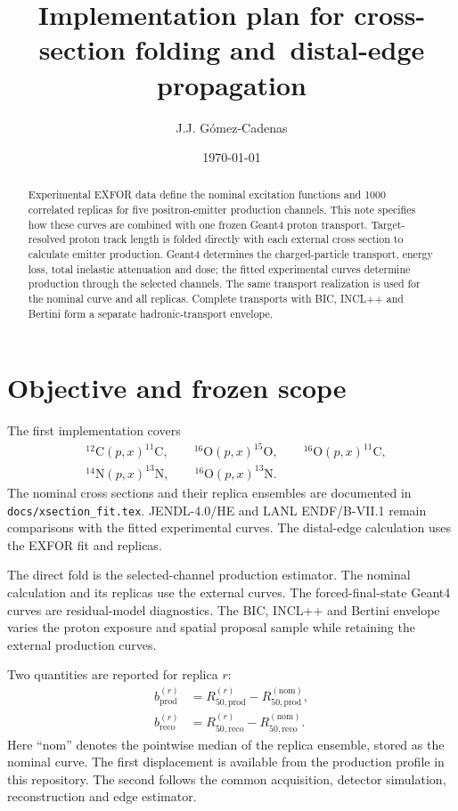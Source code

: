 \documentclass[11pt]{article}
\title{Implementation plan for cross-section folding and\
distal-edge propagation}
\author{J.J. G\'omez-Cadenas}
\date{\today}
\newcommand{\file}[1]{\texttt{#1}}
\begin{document}
\maketitle

\begin{abstract}
Experimental EXFOR data define the nominal excitation functions and 1000
correlated replicas for five positron-emitter production channels.  This note
specifies how these curves are combined with one frozen Geant4 proton
transport.  Target-resolved proton track length is folded directly with each
external cross section to calculate emitter production.  Geant4 determines
the charged-particle transport, energy loss, total inelastic attenuation and
dose; the fitted experimental curves determine production through the selected
channels.  The same transport realization is used for the nominal curve and
all replicas.  Complete transports with BIC, INCL++ and Bertini form a separate
hadronic-transport envelope.
\end{abstract}

\section{Objective and frozen scope}

The first implementation covers
\begin{equation}
\begin{split}
  &^{12}\mathrm{C}(p,x)^{11}\mathrm{C},\qquad
   ^{16}\mathrm{O}(p,x)^{15}\mathrm{O},\qquad
   ^{16}\mathrm{O}(p,x)^{11}\mathrm{C},\\
  &^{14}\mathrm{N}(p,x)^{13}\mathrm{N},\qquad
   ^{16}\mathrm{O}(p,x)^{13}\mathrm{N}.
\end{split}
\label{eq:channels}
\end{equation}
The nominal cross sections and their replica ensembles are documented in
\file{docs/xsection\_fit.tex}.  JENDL-4.0/HE and LANL ENDF/B-VII.1 remain
comparisons with the fitted experimental curves.  The distal-edge calculation
uses the EXFOR fit and replicas.

The direct fold is the selected-channel production estimator.  The nominal
calculation and its replicas use the external curves.  The forced-final-state
Geant4 curves are residual-model diagnostics.  The BIC, INCL++ and Bertini
envelope varies the proton exposure and spatial proposal sample while retaining
the external production curves.

Two quantities are reported for replica $r$:
\begin{align}
  b_{\mathrm{prod}}^{(r)} & =
  R_{50,\mathrm{prod}}^{(r)}-R_{50,\mathrm{prod}}^{(\mathrm{nom})},
  \label{eq:bprod}\\
  b_{\mathrm{reco}}^{(r)} & =
  R_{50,\mathrm{reco}}^{(r)}-R_{50,\mathrm{reco}}^{(\mathrm{nom})}.
  \label{eq:breco}
\end{align}
Here ``nom'' denotes the pointwise median of the replica ensemble, stored as
the nominal curve.
The first displacement is available from the production profile in this
repository.  The second follows the common acquisition, detector simulation,
reconstruction and edge estimator.
\end{document}
